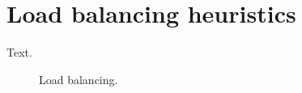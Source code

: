 \section{Load balancing heuristics}
\label{sec:heuristics}

Text.

\begin{figure}
\centering

\caption{Load balancing.}
\label{fig:weights}
\end{figure}